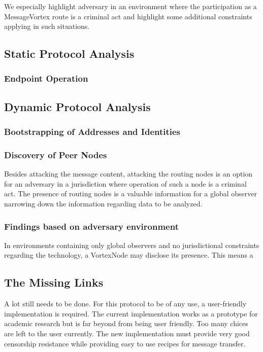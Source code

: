 \documentclass[10pt,journal,compsoc]{IEEEtran}
\begin{document}
We especially highlight adversary in an environment where the participation as a MessageVortex route is a criminal act and highlight some additional constraints applying in such situations.

\subsection{Static Protocol Analysis\label{sec:staticAnalysis}}
\subsubsection{Endpoint Operation}
\subsection{Dynamic Protocol Analysis}

\subsubsection{Bootstrapping of Addresses and Identities}


\subsubsection{Discovery of Peer Nodes}
Besides attacking the message content, attacking the routing nodes is an option for an adversary in a jurisdiction where operation of such a node is a criminal act. The presence of routing nodes is a valuable information for a global observer narrowing down the information regarding data to be analyzed.

\subsubsection{Findings based on adversary environment}
In environments containing only global observers and no jurisdictional constraints regarding the technology, a VortexNode may disclose its presence. This means a 


\subsection{The Missing Links}
A lot still needs to be done. For this protocol to be of any use, a user-friendly implementation is required. The current implementation works as a prototype for academic research but is far beyond from being user friendly. Too many chices are left to the user currently. The new implementation must provide very good censorship resistance while providing easy to use recipes for message transfer. 
\end{document}
